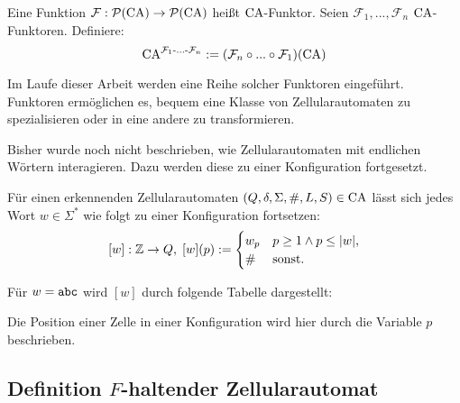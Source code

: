 \begin{definition}
    Eine Funktion $\mathcal{F}: \mathcal{P}(\textrm{CA}) \to \mathcal{P}(\textrm{CA})$ heißt $\textrm{CA}$-Funktor.
    Seien $\mathcal{F}_1, ..., \mathcal{F}_n$ $\textrm{CA}$-Funktoren. Definiere:
    \[
        \textrm{CA}^{ \mathcal{F}_1 \text{-...-} \mathcal{F}_n } := (\mathcal{F}_n \circ ... \circ \mathcal{F}_1)(\textrm{CA})
    \]
    
    Im Laufe dieser Arbeit werden eine Reihe solcher Funktoren eingeführt.
    Funktoren ermöglichen es, bequem eine Klasse von Zellularautomaten zu spezialisieren oder in eine andere zu transformieren.
\end{definition}

Bisher wurde noch nicht beschrieben, wie Zellularautomaten mit endlichen Wörtern interagieren. Dazu werden diese zu einer Konfiguration fortgesetzt.

\begin{definition}
   Für einen erkennenden Zellularautomaten $(Q, \delta, \Sigma, \#, L, S) \in \textrm{CA}$
   lässt sich jedes Wort $w \in \Sigma^*$ wie folgt zu einer Konfiguration fortsetzen:
   \[
       [w]: \mathbb{Z} \to Q, \;
       [w](p) :=
       \begin{cases} 
          w_p & p \geq 1 \land p \leq |w|, \\
          \# & \text{sonst.}
       \end{cases}
   \]
\end{definition}

\begin{exmp}[Konfiguration]
    Für $w = \texttt{abc}$ wird $[w]$ durch folgende Tabelle dargestellt:
    
    \begin{center}
    \end{center}
    
    Die Position einer Zelle in einer Konfiguration wird hier durch die Variable $p$ beschrieben.
\end{exmp}


\subsection{Definition \texorpdfstring{$F$}{F}-haltender Zellularautomat}

